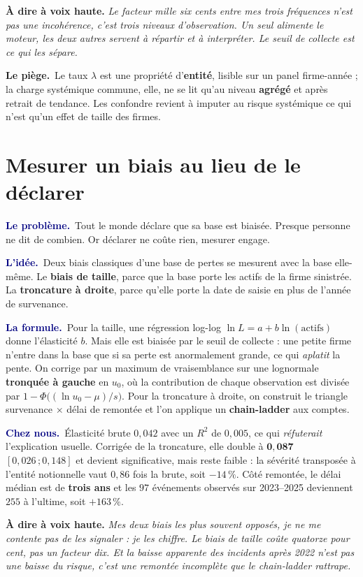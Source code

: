 \documentclass[11pt,a4paper]{article}
\newcommand{\lequoi}[1]{\smallskip\noindent\textcolor{navy}{\textbf{Le problème.}}\ #1\par}
\newcommand{\lidee}[1]{\smallskip\noindent\textcolor{navy}{\textbf{L'idée.}}\ #1\par}
\newcommand{\laformule}[1]{\smallskip\noindent\textcolor{navy}{\textbf{La formule.}}\ #1\par}
\newcommand{\cheznous}[1]{\smallskip\noindent\textcolor{navy}{\textbf{Chez nous.}}\ #1\par}
\newcommand{\lepiege}[1]{\smallskip\noindent\textcolor{accent}{\textbf{Le piège.}}\ #1\par}
\newcommand{\laphrase}[1]{\begin{phrasebox}\textbf{À dire à voix haute.} \emph{#1}\end{phrasebox}}
\begin{document}
\laphrase{Le facteur mille six cents entre mes trois fréquences n'est pas une incohérence,
c'est trois niveaux d'observation. Un seul alimente le moteur, les deux autres servent à
répartir et à interpréter. Le seuil de collecte est ce qui les sépare.}

\lepiege{Le taux $\lambda$ est une propriété d'\textbf{entité}, lisible sur un panel
firme-année ; la charge systémique commune, elle, ne se lit qu'au niveau \textbf{agrégé} et
après retrait de tendance. Les confondre revient à imputer au risque systémique ce qui n'est
qu'un effet de taille des firmes.}

\section{Mesurer un biais au lieu de le déclarer}

\lequoi{Tout le monde déclare que sa base est biaisée. Presque personne ne dit de combien. Or
déclarer ne coûte rien, mesurer engage.}

\lidee{Deux biais classiques d'une base de pertes se mesurent avec la base elle-même. Le
\textbf{biais de taille}, parce que la base porte les actifs de la firme sinistrée. La
\textbf{troncature à droite}, parce qu'elle porte la date de saisie en plus de l'année de
survenance.}

\laformule{Pour la taille, une régression log-log $\ln L = a + b\ln(\text{actifs})$ donne
l'élasticité $b$. Mais elle est biaisée par le seuil de collecte : une petite firme n'entre
dans la base que si sa perte est anormalement grande, ce qui \emph{aplatit} la pente. On
corrige par un maximum de vraisemblance sur une lognormale \textbf{tronquée à gauche} en $u_0$,
où la contribution de chaque observation est divisée par $1-\Phi\bigl((\ln u_0-\mu)/s\bigr)$.
Pour la troncature à droite, on construit le triangle survenance $\times$ délai de remontée et
l'on applique un \textbf{chain-ladder} aux comptes.}

\cheznous{Élasticité brute $0{,}042$ avec un $R^2$ de $0{,}005$, ce qui \emph{réfuterait}
l'explication usuelle. Corrigée de la troncature, elle double à $\mathbf{0{,}087}$
$[0{,}026\,;0{,}148]$ et devient significative, mais reste faible : la sévérité transposée à
l'entité notionnelle vaut $0{,}86$ fois la brute, soit $-14\,\%$. Côté remontée, le délai médian
est de \textbf{trois ans} et les $97$ événements observés sur 2023--2025 deviennent
\textbf{$255$} à l'ultime, soit $+163\,\%$.}

\laphrase{Mes deux biais les plus souvent opposés, je ne me contente pas de les signaler : je
les chiffre. Le biais de taille coûte quatorze pour cent, pas un facteur dix. Et la baisse
apparente des incidents après 2022 n'est pas une baisse du risque, c'est une remontée
incomplète que le chain-ladder rattrape.}
\end{document}
